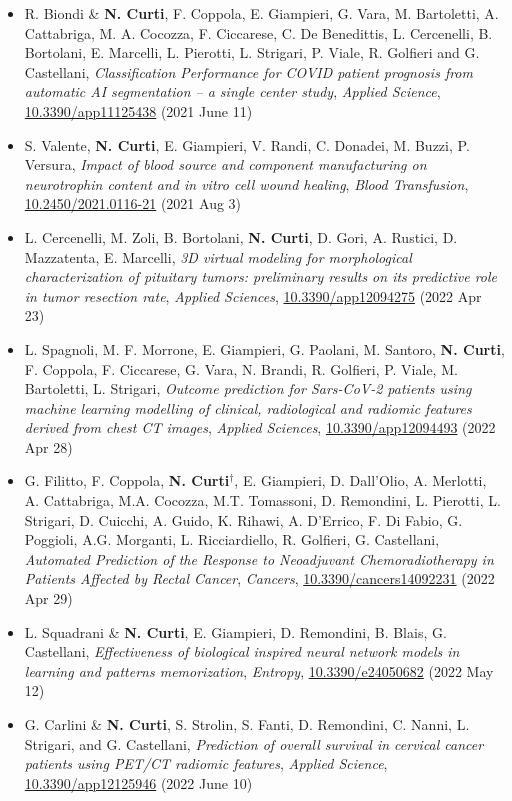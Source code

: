 \documentclass[a4paper,11pt]{article}
\newcommand{\itemicon}[2]{\item[{\texttt{[image: \#2]}}]}
\begin{document}
\begin{itemize}
  \itemicon{0.05}{article.png} R. Biondi \& \textbf{N. Curti}, F. Coppola, E. Giampieri, G. Vara, M. Bartoletti, A. Cattabriga, M. A. Cocozza, F. Ciccarese, C. De Benedittis, L. Cercenelli, B. Bortolani, E. Marcelli, L. Pierotti, L. Strigari, P. Viale, R. Golfieri and G. Castellani, \emph{Classification Performance for COVID patient prognosis from automatic AI segmentation – a single center study}, \emph{Applied Science}, \url{10.3390/app11125438} (2021 June 11)

  \itemicon{0.05}{article.png} S. Valente, \textbf{N. Curti}, E. Giampieri, V. Randi, C. Donadei, M. Buzzi, P. Versura, \emph{Impact of blood source and component manufacturing on neurotrophin content and in vitro cell wound healing}, \emph{Blood Transfusion}, \url{10.2450/2021.0116-21} (2021 Aug 3)

  \itemicon{0.05}{article.png} L. Cercenelli, M. Zoli, B. Bortolani, \textbf{N. Curti}, D. Gori, A. Rustici, D. Mazzatenta, E. Marcelli, \emph{3D virtual modeling for morphological characterization of pituitary tumors: preliminary results on its predictive role in tumor resection rate}, \emph{Applied Sciences}, \url{10.3390/app12094275} (2022 Apr 23)

  \itemicon{0.05}{article.png} L. Spagnoli, M. F. Morrone, E. Giampieri, G. Paolani, M. Santoro, \textbf{N. Curti}, F. Coppola, F. Ciccarese, G. Vara, N. Brandi, R. Golfieri, P. Viale, M. Bartoletti, L. Strigari, \emph{Outcome prediction for Sars-CoV-2 patients using machine learning modelling of clinical, radiological and radiomic features derived from chest CT images}, \emph{Applied Sciences}, \url{10.3390/app12094493} (2022 Apr 28)

  \itemicon{0.05}{article.png} G. Filitto, F. Coppola, \textbf{N. Curti$^\dagger$}, E. Giampieri, D. Dall’Olio, A. Merlotti, A. Cattabriga, M.A. Cocozza, M.T. Tomassoni, D. Remondini, L. Pierotti, L. Strigari, D. Cuicchi, A. Guido, K. Rihawi, A. D'Errico, F. Di Fabio, G. Poggioli, A.G. Morganti, L. Ricciardiello, R. Golfieri, G. Castellani, \emph{Automated Prediction of the Response to Neoadjuvant Chemoradiotherapy in Patients Affected by Rectal Cancer}, \emph{Cancers}, \url{10.3390/cancers14092231} (2022 Apr 29)

  \itemicon{0.05}{article.png} L. Squadrani \& \textbf{N. Curti}, E. Giampieri, D. Remondini, B. Blais, G. Castellani, \emph{Effectiveness of biological inspired neural network models in learning and patterns memorization}, \emph{Entropy}, \url{10.3390/e24050682} (2022 May 12)

  \itemicon{0.05}{article.png} G. Carlini \& \textbf{N. Curti}, S. Strolin, S. Fanti, D. Remondini, C. Nanni, L. Strigari, and G. Castellani, \emph{Prediction of overall survival in cervical cancer patients using PET/CT radiomic features}, \emph{Applied Science}, \url{10.3390/app12125946} (2022 June 10)

\end{itemize}
\end{document}
